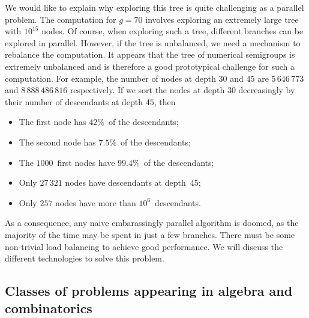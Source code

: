 \documentclass{deliverablereport}
\begin{document}
We would like to explain why exploring this tree is quite challenging as a
parallel problem. The computation for $g=70$ involves exploring an extremely
large tree with $10^{15}$ nodes. Of course, when exploring such a tree,
different branches can be explored in parallel. However, if the tree is
unbalanced, we need a mechanism to rebalance the computation. It appears that
the tree of numerical semigroups is extremely unbalanced and is therefore a good
prototypical challenge for such a computation. For example, the number of nodes at depth 30 and 45
are $5\,646\,773$ and $8\,888\,486\,816$ respectively. If we sort the nodes
at depth $30$ decreasingly by their number of descendants at depth $45$, then
\begin{itemize}
\item The first node has $42\%$~of the descendants;
\item The second node has $7.5\%$~of the descendants;
\item The $1000$~first nodes have $99.4\%$~of the descendants;
\item Only $27\,321$ nodes have descendants at depth~$45$;
\item Only $257$ nodes have more than $10^6$~descendants.
\end{itemize}
As a consequence, any
naive embarassingly parallel algorithm is doomed, as the majority
of the time may be spent in just a few branches. There must be
some non-trivial load balancing to achieve good performance.  We will discuss the
different technologies to solve this problem.

 
\subsection{Classes of problems appearing in algebra and combinatorics}
\end{document}
